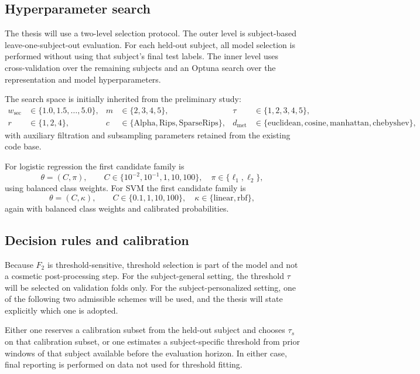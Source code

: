 \documentclass[11pt]{article}
\newcommand{\1}{\mathbf 1}
\begin{document}
\subsection{Hyperparameter search}

The thesis will use a two-level selection protocol. The outer level is subject-based leave-one-subject-out evaluation. For each held-out subject, all model selection is performed without using that subject's final test labels. The inner level uses cross-validation over the remaining subjects and an Optuna search over the representation and model hyperparameters.

The search space is initially inherited from the preliminary study:
\begin{align*}
  w_{\mathrm{sec}}&\in\{1.0,1.5,\dots,5.0\},
  &m&\in\{2,3,4,5\},
  &\tau&\in\{1,2,3,4,5\},\\
  r&\in\{1,2,4\},
  &c&\in\{\mathrm{Alpha},\mathrm{Rips},\mathrm{SparseRips}\},
  &d_{\mathrm{met}}&\in\{\mathrm{euclidean},\mathrm{cosine},\mathrm{manhattan},\mathrm{chebyshev}\},
\end{align*}
with auxiliary filtration and subsampling parameters retained from the existing code base.

For logistic regression the first candidate family is
\[
  \theta=(C,\pi),
  \qquad
  C\in\{10^{-2},10^{-1},1,10,100\},
  \quad
  \pi\in\{\ell_1,\ell_2\},
\]
using balanced class weights. For SVM the first candidate family is
\[
  \theta=(C,\kappa),
  \qquad
  C\in\{0.1,1,10,100\},
  \quad
  \kappa\in\{\mathrm{linear},\mathrm{rbf}\},
\]
again with balanced class weights and calibrated probabilities.

\subsection{Decision rules and calibration}

Because $F_2$ is threshold-sensitive, threshold selection is part of the model and not a cosmetic post-processing step. For the subject-general setting, the threshold $\tau$ will be selected on validation folds only. For the subject-personalized setting, one of the following two admissible schemes will be used, and the thesis will state explicitly which one is adopted.

Either one reserves a calibration subset from the held-out subject and chooses $\tau_s$ on that calibration subset, or one estimates a subject-specific threshold from prior windows of that subject available before the evaluation horizon. In either case, final reporting is performed on data not used for threshold fitting.
\end{document}
